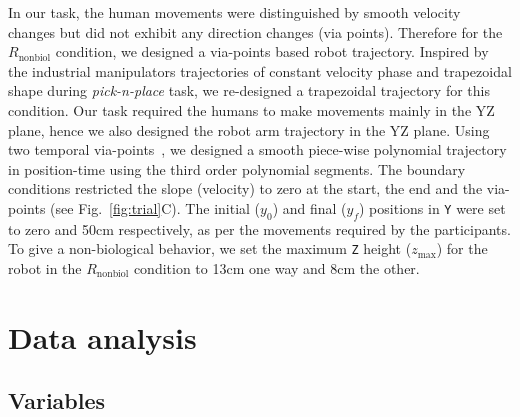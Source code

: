 In our task, the human movements were distinguished by smooth velocity changes but did not exhibit any direction changes (via points). Therefore for the $R_{\text{nonbiol}}$ condition, we designed a via-points based robot trajectory. Inspired by the industrial manipulators trajectories of constant velocity phase and trapezoidal shape during {\it pick-n-place} task, we re-designed a trapezoidal trajectory for this condition. Our task required the humans to make movements mainly in the YZ plane, hence we also designed the robot arm trajectory in the YZ plane. Using two temporal via-points~\cite{Biagiotti:Springer:2008}, we designed a smooth piece-wise polynomial trajectory in position-time using the third order polynomial segments. The boundary conditions restricted the slope (velocity) to zero at the start, the end and the via-points (see Fig.~\ref{fig:trial}C). The initial ($y_0$) and final ($y_f$) positions in \texttt{Y} were set to zero and 50cm respectively, as per the movements required by the participants. To give a non-biological behavior, we set the maximum \texttt{Z} height ($z_{\max}$) for the robot in the $R_{\text{nonbiol}}$ condition to 13cm one way and 8cm the other. 




\clearpage
\section{Data analysis}

\subsection{Variables}

